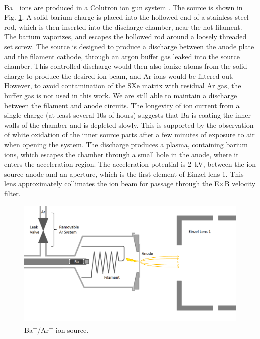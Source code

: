 Ba\textsuperscript{+} ions are produced in a Colutron ion gun system \cite{Colutron}.  The source is shown in Fig. \ref{fig:ionsource}.  A solid barium charge is placed into the hollowed end of a stainless steel rod, which is then inserted into the discharge chamber, near the hot filament.  The barium vaporizes, and escapes the hollowed rod around a loosely threaded set screw.  The source is designed to produce a discharge between the anode plate and the filament cathode, through an argon buffer gas leaked into the source chamber.  This controlled discharge would then also ionize atoms from the solid charge to produce the desired ion beam, and Ar ions would be filtered out.  However, to avoid contamination of the SXe matrix with residual Ar gas, the buffer gas is not used in this work.  We are still able to maintain a discharge between the filament and anode circuits.  The longevity of ion current from a single charge (at least several 10s of hours) suggests that Ba is coating the inner walls of the chamber and is depleted slowly.  This is supported by the observation of white oxidation of the inner source parts after a few minutes of exposure to air when opening the system.  The discharge produces a plasma, containing barium ions, which escapes the chamber through a small hole in the anode, where it enters the acceleration region.  The acceleration potential is 2~kV, between the ion source anode and an aperture, which is the first element of Einzel lens 1.  This lens approximately collimates the ion beam for passage through the E$\times$B velocity filter.

\begin{figure} %
        \centering
                \includegraphics[width=.95\textwidth]{figures/ionSource.png}
                \caption{Ba\textsuperscript{+}/Ar\textsuperscript{+} ion source.}
\label{fig:ionsource}
\end{figure}

